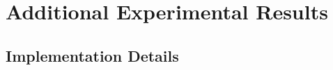 
\section{Additional Experimental Results}




\subsection{Implementation Details}\label{sec:app-impl}








